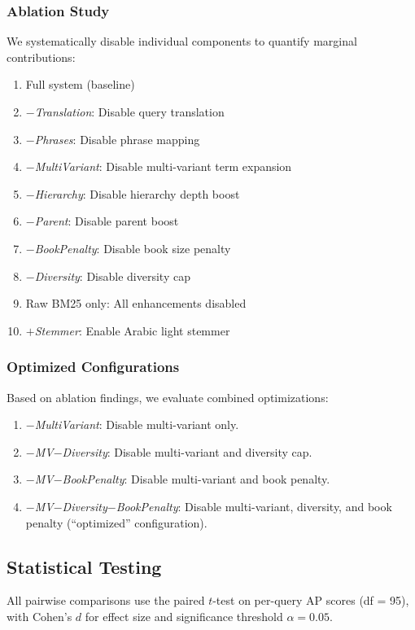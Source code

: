 \documentclass[preprint,12pt,authoryear]{elsarticle}
\begin{document}
\subsubsection{Ablation Study}
We systematically disable individual components to quantify marginal contributions:
\begin{enumerate}
    \item Full system (baseline)
    \item \textit{$-$Translation}: Disable query translation
    \item \textit{$-$Phrases}: Disable phrase mapping
    \item \textit{$-$MultiVariant}: Disable multi-variant term expansion
    \item \textit{$-$Hierarchy}: Disable hierarchy depth boost
    \item \textit{$-$Parent}: Disable parent boost
    \item \textit{$-$BookPenalty}: Disable book size penalty
    \item \textit{$-$Diversity}: Disable diversity cap
    \item Raw BM25 only: All enhancements disabled
    \item \textit{$+$Stemmer}: Enable Arabic light stemmer
\end{enumerate}

\subsubsection{Optimized Configurations}
Based on ablation findings, we evaluate combined optimizations:
\begin{enumerate}
    \item \textit{$-$MultiVariant}: Disable multi-variant only.
    \item \textit{$-$MV$-$Diversity}: Disable multi-variant and diversity cap.
    \item \textit{$-$MV$-$BookPenalty}: Disable multi-variant and book penalty.
    \item \textit{$-$MV$-$Diversity$-$BookPenalty}: Disable multi-variant, diversity, and book penalty (``optimized'' configuration).
\end{enumerate}

\subsection{Statistical Testing}

All pairwise comparisons use the paired $t$-test on per-query AP scores (df = 95), with Cohen's $d$ for effect size and significance threshold $\alpha = 0.05$.
\end{document}
